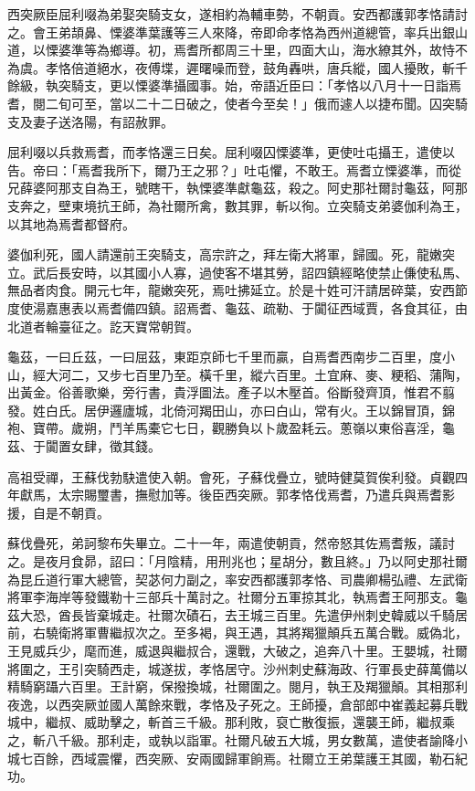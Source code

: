 \begin{pinyinscope}
 西突厥臣屈利啜為弟娶突騎支女，遂相約為輔車勢，不朝貢。安西都護郭孝恪請討之。會王弟頡鼻、慄婆準葉護等三人來降，帝即命孝恪為西州道總管，率兵出銀山道，以慄婆準等為鄉導。初，焉耆所都周三十里，四面大山，海水繚其外，故恃不為虞。孝恪倍道絕水，夜傅堞，遲曙噪而登，鼓角轟哄，唐兵縱，國人擾敗，斬千餘級，執突騎支，更以慄婆準攝國事。始，帝語近臣曰：「孝恪以八月十一日詣焉耆，閱二旬可至，當以二十二日破之，使者今至矣！」俄而遽人以捷布聞。囚突騎支及妻子送洛陽，有詔赦罪。



 屈利啜以兵救焉耆，而孝恪還三日矣。屈利啜囚慄婆準，更使吐屯攝王，遣使以告。帝曰：「焉耆我所下，爾乃王之邪？」吐屯懼，不敢王。焉耆立慄婆準，而從兄薛婆阿那支自為王，號瞎干，執慄婆準獻龜茲，殺之。阿史那社爾討龜茲，阿那支奔之，壁東境抗王師，為社爾所禽，數其罪，斬以徇。立突騎支弟婆伽利為王，以其地為焉耆都督府。



 婆伽利死，國人請還前王突騎支，高宗許之，拜左衛大將軍，歸國。死，龍嫩突立。武后長安時，以其國小人寡，過使客不堪其勞，詔四鎮經略使禁止傔使私馬、無品者肉食。開元七年，龍嫩突死，焉吐拂延立。於是十姓可汗請居碎葉，安西節度使湯嘉惠表以焉耆備四鎮。詔焉耆、龜茲、疏勒、于闐征西域賈，各食其征，由北道者輪臺征之。訖天寶常朝賀。



 龜茲，一曰丘茲，一曰屈茲，東距京師七千里而贏，自焉耆西南步二百里，度小山，經大河二，又步七百里乃至。橫千里，縱六百里。土宜麻、麥、粳稻、蒲陶，出黃金。俗善歌樂，旁行書，貴浮圖法。產子以木壓首。俗斷發齊頂，惟君不翦發。姓白氏。居伊邏廬城，北倚河羯田山，亦曰白山，常有火。王以錦冒頂，錦袍、寶帶。歲朔，鬥羊馬橐它七日，觀勝負以卜歲盈耗云。蔥嶺以東俗喜淫，龜茲、于闐置女肆，徵其錢。



 高祖受禪，王蘇伐勃駃遣使入朝。會死，子蘇伐疊立，號時健莫賀俟利發。貞觀四年獻馬，太宗賜璽書，撫慰加等。後臣西突厥。郭孝恪伐焉耆，乃遣兵與焉耆影援，自是不朝貢。



 蘇伐疊死，弟訶黎布失畢立。二十一年，兩遣使朝貢，然帝怒其佐焉耆叛，議討之。是夜月食昴，詔曰：「月陰精，用刑兆也；星胡分，數且終。」乃以阿史那社爾為昆丘道行軍大總管，契苾何力副之，率安西都護郭孝恪、司農卿楊弘禮、左武衛將軍李海岸等發鐵勒十三部兵十萬討之。社爾分五軍掠其北，執焉耆王阿那支。龜茲大恐，酋長皆棄城走。社爾次磧石，去王城三百里。先遣伊州刺史韓威以千騎居前，右驍衛將軍曹繼叔次之。至多褐，與王遇，其將羯獵顛兵五萬合戰。威偽北，王見威兵少，麾而進，威退與繼叔合，還戰，大破之，追奔八十里。王嬰城，社爾將圍之，王引突騎西走，城遂拔，孝恪居守。沙州刺史蘇海政、行軍長史薛萬備以精騎窮躡六百里。王計窮，保撥換城，社爾圍之。閱月，執王及羯獵顛。其相那利夜逸，以西突厥並國人萬餘來戰，孝恪及子死之。王師擾，倉部郎中崔義起募兵戰城中，繼叔、威助擊之，斬首三千級。那利敗，裒亡散復振，還襲王師，繼叔乘之，斬八千級。那利走，或執以詣軍。社爾凡破五大城，男女數萬，遣使者諭降小城七百餘，西域震懼，西突厥、安兩國歸軍餉焉。社爾立王弟葉護王其國，勒石紀功。




\end{pinyinscope}
